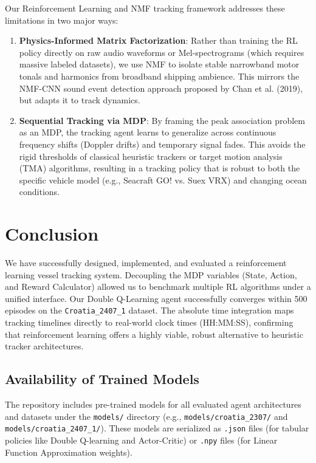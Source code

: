 \documentclass[12pt,a4paper]{article}
\begin{document}
Our Reinforcement Learning and NMF tracking framework addresses these limitations in two major ways:
\begin{enumerate}
    \item \textbf{Physics-Informed Matrix Factorization}: Rather than training the RL policy directly on raw audio waveforms or Mel-spectrograms (which requires massive labeled datasets), we use NMF to isolate stable narrowband motor tonals and harmonics from broadband shipping ambience. This mirrors the NMF-CNN sound event detection approach proposed by Chan et al. (2019), but adapts it to track dynamics.
    \item \textbf{Sequential Tracking via MDP}: By framing the peak association problem as an MDP, the tracking agent learns to generalize across continuous frequency shifts (Doppler drifts) and temporary signal fades. This avoids the rigid thresholds of classical heuristic trackers or target motion analysis (TMA) algorithms, resulting in a tracking policy that is robust to both the specific vehicle model (e.g., Seacraft GO! vs. Suex VRX) and changing ocean conditions.
\end{enumerate}

\section{Conclusion}
We have successfully designed, implemented, and evaluated a reinforcement learning vessel tracking system. Decoupling the MDP variables (State, Action, and Reward Calculator) allowed us to benchmark multiple RL algorithms under a unified interface. Our Double Q-Learning agent successfully converges within 500 episodes on the \texttt{Croatia\_2407\_1} dataset. The absolute time integration maps tracking timelines directly to real-world clock times (HH:MM:SS), confirming that reinforcement learning offers a highly viable, robust alternative to heuristic tracker architectures.

\subsection{Availability of Trained Models}
The repository includes pre-trained models for all evaluated agent architectures and datasets under the \texttt{models/} directory (e.g., \texttt{models/croatia\_2307/} and \texttt{models/croatia\_2407\_1/}). These models are serialized as \texttt{.json} files (for tabular policies like Double Q-learning and Actor-Critic) or \texttt{.npy} files (for Linear Function Approximation weights).
\end{document}
